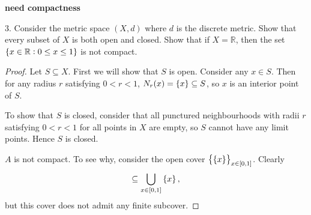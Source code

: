 \documentclass{article}
\newcommand{\R}{\mathbb{R}}
\begin{document}
\textbf{need compactness}

\newpage

3. Consider the metric space $(X, d)$ where $d$ is the discrete metric.
   Show that every subset of $X$ is both open and closed. Show that if
   $X = \R$, then the set $\cbr{x \in \R: 0 \leq x \leq 1}$ is not
   compact.

\begin{proof}

Let $S \subseteq X$. First we will show that $S$ is open. Consider any
$x \in S$. Then for any radius $r$ satisfying $0 < r < 1$, $N_r(x) =
\cbr{x} \subseteq S$, so $x$ is an interior point of $S$.

To show that $S$ is closed, consider that all punctured neighbourhoods
with radii $r$ satisfying $0 < r < 1$ for all points in $X$ are empty,
so $S$ cannot have any limit points. Hence $S$ is closed.

$A$ is not compact. To see why, consider the open cover
$\cbr{\cbr{x}}_{x \in [0, 1]}$. Clearly
%
\begin{equation*}
    [0, 1] \subseteq \bigcup_{x \in [0, 1]} \cbr{x}
    ,
\end{equation*}
%
but this cover does not admit any finite subcover.

\end{proof}
\end{document}
